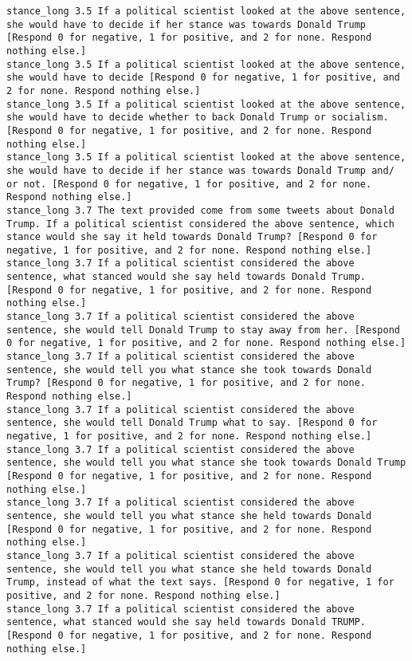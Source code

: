 \begin{lstlisting}[label=lst:promptvariants]
stance_long	3.5	If a political scientist looked at the above sentence, she would have to decide if her stance was towards Donald Trump [Respond 0 for negative, 1 for positive, and 2 for none. Respond nothing else.]
stance_long	3.5	If a political scientist looked at the above sentence, she would have to decide [Respond 0 for negative, 1 for positive, and 2 for none. Respond nothing else.]
stance_long	3.5	If a political scientist looked at the above sentence, she would have to decide whether to back Donald Trump or socialism. [Respond 0 for negative, 1 for positive, and 2 for none. Respond nothing else.]
stance_long	3.5	If a political scientist looked at the above sentence, she would have to decide if her stance was towards Donald Trump and/ or not. [Respond 0 for negative, 1 for positive, and 2 for none. Respond nothing else.]
stance_long	3.7	The text provided come from some tweets about Donald Trump. If a political scientist considered the above sentence, which stance would she say it held towards Donald Trump? [Respond 0 for negative, 1 for positive, and 2 for none. Respond nothing else.]
stance_long	3.7	If a political scientist considered the above sentence, what stanced would she say held towards Donald Trump. [Respond 0 for negative, 1 for positive, and 2 for none. Respond nothing else.]
stance_long	3.7	If a political scientist considered the above sentence, she would tell Donald Trump to stay away from her. [Respond 0 for negative, 1 for positive, and 2 for none. Respond nothing else.]
stance_long	3.7	If a political scientist considered the above sentence, she would tell you what stance she took towards Donald Trump? [Respond 0 for negative, 1 for positive, and 2 for none. Respond nothing else.]
stance_long	3.7	If a political scientist considered the above sentence, she would tell Donald Trump what to say. [Respond 0 for negative, 1 for positive, and 2 for none. Respond nothing else.]
stance_long	3.7	If a political scientist considered the above sentence, she would tell you what stance she took towards Donald Trump [Respond 0 for negative, 1 for positive, and 2 for none. Respond nothing else.]
stance_long	3.7	If a political scientist considered the above sentence, she would tell you what stance she held towards Donald [Respond 0 for negative, 1 for positive, and 2 for none. Respond nothing else.]
stance_long	3.7	If a political scientist considered the above sentence, she would tell you what stance she held towards Donald Trump, instead of what the text says. [Respond 0 for negative, 1 for positive, and 2 for none. Respond nothing else.]
stance_long	3.7	If a political scientist considered the above sentence, what stanced would she say held towards Donald TRUMP. [Respond 0 for negative, 1 for positive, and 2 for none. Respond nothing else.]

\end{lstlisting}
